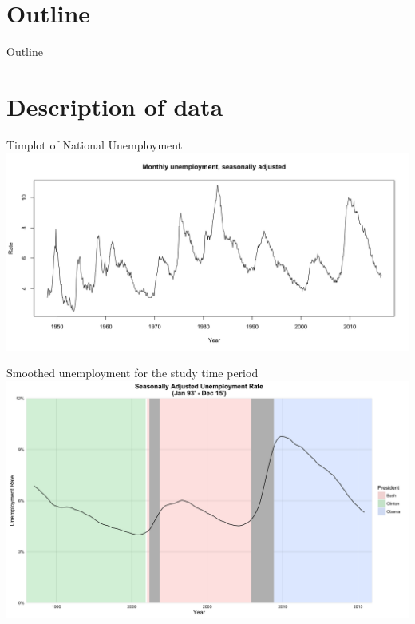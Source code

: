 \documentclass[ignorenonframetext]{beamer}
\begin{document}
\begin{frame}
	\titlepage
\end{frame}


	\section*{Outline}
	\begin{frame}{Outline}
		\tableofcontents
	\end{frame}
	
\section{Description of data}

  	\begin{frame}{Timplot of National Unemployment}
		\includegraphics[width=\textwidth]{images/unemployment_total_sa}
  	\end{frame}
 
  	\begin{frame}{Smoothed unemployment for the study time period}
		\includegraphics[width=\linewidth]{images/presunemp}
  	\end{frame}
\end{document}
